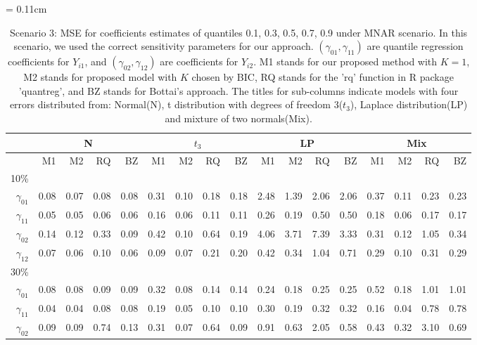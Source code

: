 \documentclass[12pt]{article}
\begin{document}
  \begin{table}
\centering
    \caption{Scenario 3: MSE for coefficients estimates of quantiles 0.1, 0.3, 0.5, 0.7, 0.9 under MNAR scenario.
In this scenario, we used the correct sensitivity parameters for our approach.
$(\gamma_{01}, \gamma_{11})$ are quantile regression coefficients for $Y_{i1}$, and $(\gamma_{02}, \gamma_{12})$ are coefficients for $Y_{i2}$. M1 stands for our proposed method with $K = 1$, M2 stands for proposed model with $K$ chosen by BIC, RQ stands for the 'rq' function in R package 'quantreg', and BZ stands for Bottai's approach.
The titles for sub-columns indicate models with four errors distributed from: Normal(N), t distribution with degrees of freedom 3($t_3$),
Laplace distribution(LP) and mixture of two normals(Mix).
}\label{tab:sim3}
    \vspace{10pt} \tabcolsep = 0.11cm
    \begin{tabular}{r|rrrr|rrrr|rrrr|rrrr}
      \hline
              & \multicolumn{4}{c|}{N} & \multicolumn{4}{c|}{$t_3$}   & \multicolumn{4}{c|}{LP}   & \multicolumn{4}{c}{Mix}   \\
      \hline
           & M1                      & M2 & RQ & BZ   & M1                      & M2 & RQ & BZ   & M1                      & M2 & RQ & BZ   & M1                      & M2 & RQ & BZ \\
10\% &&&&&&&&&&&&&&&\\
$\gamma_{01}$ & 0.08 & 0.07 & 0.08 & 0.08 & 0.31 & 0.10 & 0.18 & 0.18 & 2.48 & 1.39 & 2.06 & 2.06 & 0.37 & 0.11 & 0.23 & 0.23 \\
$\gamma_{11}$ & 0.05 & 0.05 & 0.06 & 0.06 & 0.16 & 0.06 & 0.11 & 0.11 & 0.26 & 0.19 & 0.50 & 0.50 & 0.18 & 0.06 & 0.17 & 0.17 \\
$\gamma_{02}$ & 0.14 & 0.12 & 0.33 & 0.09 & 0.42 & 0.10 & 0.64 & 0.19 & 4.06 & 3.71 & 7.39 & 3.33 & 0.31 & 0.12 & 1.05 & 0.34 \\
$\gamma_{12}$ & 0.07 & 0.06 & 0.10 & 0.06 & 0.09 & 0.07 & 0.21 & 0.20 & 0.42 & 0.34 & 1.04 & 0.71 & 0.29 & 0.10 & 0.31 & 0.29 \\
30\% &&&&&&&&&&&&&&&\\
$\gamma_{01}$ & 0.08 & 0.08 & 0.09 & 0.09 & 0.32 & 0.08 & 0.14 & 0.14 & 0.24 & 0.18 & 0.25 & 0.25 & 0.52 & 0.18 & 1.01 & 1.01 \\
$\gamma_{11}$ & 0.04 & 0.04 & 0.08 & 0.08 & 0.19 & 0.05 & 0.10 & 0.10 & 0.30 & 0.19 & 0.32 & 0.32 & 0.16 & 0.04 & 0.78 & 0.78 \\
$\gamma_{02}$ & 0.09 & 0.09 & 0.74 & 0.13 & 0.31 & 0.07 & 0.64 & 0.09 & 0.91 & 0.63 & 2.05 & 0.58 & 0.43 & 0.32 & 3.10 & 0.69 \\

\end{tabular}
\end{table}
\end{document}
